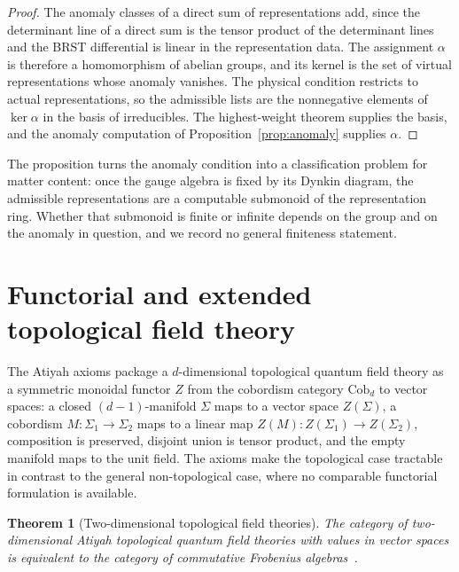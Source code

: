 \documentclass[11pt,letterpaper]{article}
\newtheorem{theorem}{Theorem}[section]
\theoremstyle{definition}
\theoremstyle{remark}
\begin{document}
\begin{proof}
The anomaly classes of a direct sum of representations add, since the determinant line of a direct sum is the tensor product of the determinant lines and the BRST differential is linear in the representation data. The assignment $\alpha$ is therefore a homomorphism of abelian groups, and its kernel is the set of virtual representations whose anomaly vanishes. The physical condition restricts to actual representations, so the admissible lists are the nonnegative elements of $\ker \alpha$ in the basis of irreducibles. The highest-weight theorem supplies the basis, and the anomaly computation of Proposition~\ref{prop:anomaly} supplies $\alpha$.
\end{proof}

The proposition turns the anomaly condition into a classification problem for matter content: once the gauge algebra is fixed by its Dynkin diagram, the admissible representations are a computable submonoid of the representation ring. Whether that submonoid is finite or infinite depends on the group and on the anomaly in question, and we record no general finiteness statement.

\section{Functorial and extended topological field theory}
\label{sec:tqft}

The Atiyah axioms package a $d$-dimensional topological quantum field theory as a symmetric monoidal functor $Z$ from the cobordism category $\mathrm{Cob}_d$ to vector spaces: a closed $(d-1)$-manifold $\Sigma$ maps to a vector space $Z(\Sigma)$, a cobordism $M: \Sigma_1 \to \Sigma_2$ maps to a linear map $Z(M): Z(\Sigma_1) \to Z(\Sigma_2)$, composition is preserved, disjoint union is tensor product, and the empty manifold maps to the unit field. The axioms make the topological case tractable in contrast to the general non-topological case, where no comparable functorial formulation is available.

\begin{theorem}[Two-dimensional topological field theories]
\label{thm:frobenius}
The category of two-dimensional Atiyah topological quantum field theories with values in vector spaces is equivalent to the category of commutative Frobenius algebras~\cite{atiyah-tqft}.
\end{theorem}
\end{document}
